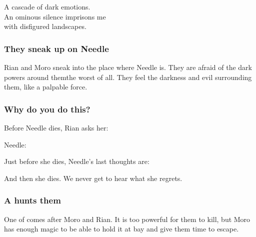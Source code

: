 \begin{garbage}
{  A cascade of dark emotions. \\
  An ominous silence imprisons me\\
  with disfigured landscapes.
}





\subsubsection{They sneak up on Needle}
Rian and Moro sneak into the place where Needle is. 
They are afraid of the dark powers around them\dash the \banes{} worst of all. 
They feel the darkness and evil surrounding them, like a palpable force. 






\subsubsection{Why do you do this?}
Before Needle dies, Rian asks her: 

Needle: 

Just before she dies, Needle's last thoughts are: 

And then she dies. 
We never get to hear what she regrets. 





\subsubsection{A \bane{} hunts them}
One of  comes after Moro and Rian. It is too powerful for them to kill, but Moro has enough magic to be able to hold it at bay and give them time to escape. 


\end{garbage}
